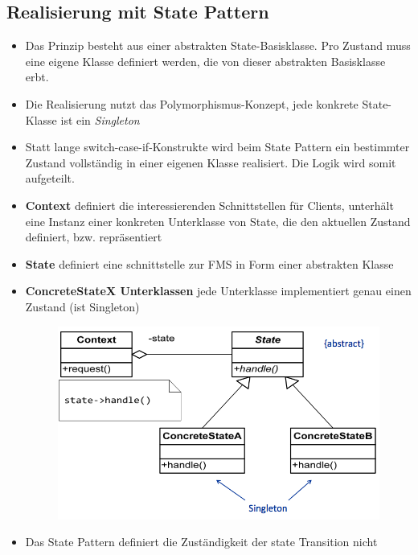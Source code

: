 \subsection{Realisierung mit State Pattern}
\begin{itemize}
      \item Das Prinzip besteht aus einer abstrakten State-Basisklasse. Pro Zustand
            muss eine eigene Klasse definiert werden, die von dieser abstrakten
            Basisklasse erbt.
      \item Die Realisierung nutzt das Polymorphismus-Konzept, jede konkrete
            State-Klasse ist ein \textit{Singleton}
      \item Statt lange switch-case-if-Konstrukte wird beim State Pattern ein
            bestimmter Zustand vollständig in einer eigenen Klasse realisiert. Die Logik
            wird somit aufgeteilt.
      \item \textbf{Context} definiert die interessierenden Schnittstellen für
            Clients, unterhält eine Instanz einer konkreten Unterklasse von State, die den
            aktuellen Zustand definiert, bzw. repräsentiert
      \item \textbf{State} definiert eine schnittstelle zur FMS in Form einer
            abstrakten Klasse
      \item \textbf{ConcreteStateX Unterklassen} jede Unterklasse implementiert
            genau einen Zustand (ist Singleton)
            \begin{figure}[H]
                  \centering
                  \includegraphics[scale = 0.3]{images/FSM/state_pattern}
            \end{figure}
      \item Das State Pattern definiert die Zuständigkeit der state Transition nicht

\end{itemize}
